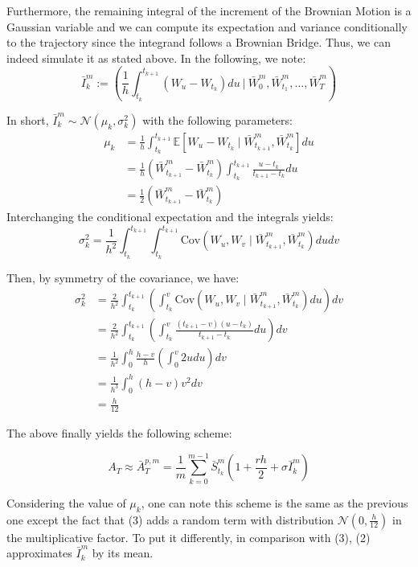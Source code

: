 \documentclass{article}
\begin{document}
Furthermore, the remaining integral of the increment of the Brownian Motion is a Gaussian variable and we can
compute its expectation and variance conditionally to the trajectory since the integrand follows a Brownian Bridge.
Thus, we can indeed simulate it as stated above. In the following, we note:
\[
	\bar I_k^m := \left( \frac{1}{h}
	\int_{t_k}^{t_{k+1}} \left( W_u - W_{t_k} \right) du \ \Big\vert \ \bar W_0^m, \bar W_{t_1}^m, \dots, \bar W_T^m
	\right)
\]

In short, $\bar I_k^m \sim \mathcal N(\mu_k, \sigma_k^2)$ with the following parameters:
\begin{align*}
	\mu_k
	&= \frac{1}{h} \int_{t_k}^{t_{k+1}} \mathbb E \left[ W_u - W_{t_k} \mid \bar W_{t_{k+1}}^m, \bar W_{t_k}^m \right] du \\
	&= \frac{1}{h} \left( \bar W_{t_{k+1}}^m - \bar W_{t_k}^m \right) \int_{t_k}^{t_{k+1}} \frac{u - t_k}{t_{k+1} - t_k} du \\
	&= \frac{1}{2} \left( \bar W_{t_{k+1}}^m - \bar W_{t_k}^m \right)
\end{align*}
Interchanging the conditional expectation and the integrals yields:
\[
	\sigma_k^2 = \frac{1}{h^2} \int_{t_k}^{t_{k+1}} \int_{t_k}^{t_{k+1}}
		\mathrm{Cov} \left( W_u, W_v \mid \bar W_{t_{k+1}}^m, \bar W_{t_k}^m \right) du dv 
\]

\noindent Then, by symmetry of the covariance, we have:
\begin{align*}
	\sigma_k^2 &= \frac{2}{h^2} \int_{t_k}^{t_{k+1}} \left( \int_{t_k}^{v}
		\mathrm{Cov} \left( W_u, W_v \mid \bar W_{t_{k+1}}^m, \bar W_{t_k}^m \right) du \right) dv 
	 \\
	&= \frac{2}{h^2} \int_{t_k}^{t_{k+1}} \left( \int_{t_k}^{v} \frac{(t_{k+1} - v)(u - t_k)}{t_{k+1} - t_k} du \right) dv \\
	&= \frac{1}{h^2} \int_{0}^{h} \frac{h - v}{h} \left( \int_{0}^{v} 2u du \right) dv \\
	&= \frac{1}{h^3} \int_{0}^{h} (h - v) v^2 dv \\
	&= \frac{h}{12}
\end{align*}

The above finally yields the following scheme:

\begin{equation}
    A_T \approx \bar A_T^{p, m} = \frac{1}{m} \sum_{k=0}^{m-1}
    	\bar S_{t_k}^m \left( 1 + \frac{rh}{2} + \sigma \bar I_k^m \right) \tag{3}
\end{equation}

Considering the value of $\mu_k$, one can note this scheme is the same as the previous one except the fact
that (3) adds a random term with distribution $\mathcal N(0, \frac{h}{12})$ in the multiplicative factor.
To put it differently, in comparison with (3), (2) approximates $\bar I_k^m$ by its mean.
\end{document}
